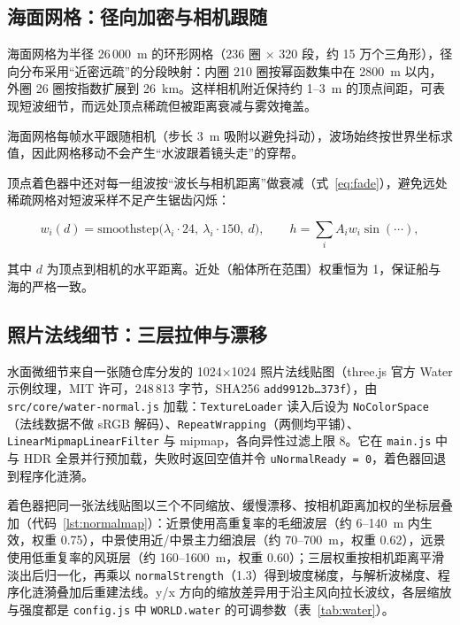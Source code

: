 \documentclass[UTF8, a4paper, 11pt]{ctexart}
\newcommand{\file}[1]{\texttt{#1}}
\begin{document}
\subsection{海面网格：径向加密与相机跟随}

海面网格为半径 26\,000~m 的环形网格（236 圈 $\times$ 320 段，约 15 万个三角形），径向分布采用“近密远疏”的分段映射：内圈 210 圈按幂函数集中在 2800~m 以内，外圈 26 圈按指数扩展到 26~km。这样相机附近保持约 1--3~m 的顶点间距，可表现短波细节，而远处顶点稀疏但被距离衰减与雾效掩盖。

海面网格每帧水平跟随相机（步长 3~m 吸附以避免抖动），波场始终按世界坐标求值，因此网格移动不会产生“水波跟着镜头走”的穿帮。

顶点着色器中还对每一组波按“波长与相机距离”做衰减（式~\ref{eq:fade}），避免远处稀疏网格对短波采样不足产生锯齿闪烁：

\begin{equation}
w_i(d)=\mathrm{smoothstep}\big(\lambda_i\!\cdot\!24,\ \lambda_i\!\cdot\!150,\ d\big),\qquad
h=\sum_i A_i w_i \sin(\cdots),
\label{eq:fade}
\end{equation}

其中 $d$ 为顶点到相机的水平距离。近处（船体所在范围）权重恒为 1，保证船与海的严格一致。

\subsection{照片法线细节：三层拉伸与漂移}

水面微细节来自一张随仓库分发的 1024$\times$1024 照片法线贴图（three.js 官方 Water 示例纹理，MIT 许可，248\,813 字节，SHA256 \texttt{add9912b\ldots 373f}），由 \file{src/core/water-normal.js} 加载：\texttt{TextureLoader} 读入后设为 \texttt{NoColorSpace}（法线数据不做 sRGB 解码）、\texttt{RepeatWrapping}（两侧均平铺）、\texttt{LinearMipmapLinearFilter} 与 mipmap，各向异性过滤上限 8。它在 \file{main.js} 中与 HDR 全景并行预加载，失败时返回空值并令 \texttt{uNormalReady = 0}，着色器回退到程序化涟漪。

着色器把同一张法线贴图以三个不同缩放、缓慢漂移、按相机距离加权的坐标层叠加（代码~\ref{lst:normalmap}）：近景使用高重复率的毛细波层（约 6--140~m 内生效，权重 0.75），中景使用近/中景主力细浪层（约 70--700~m，权重 0.62），远景使用低重复率的风斑层（约 160--1600~m，权重 0.60）；三层权重按相机距离平滑淡出后归一化，再乘以 \texttt{normalStrength}（1.3）得到坡度梯度，与解析波梯度、程序化涟漪叠加后重建法线。y/x 方向的缩放差异用于沿主风向拉长波纹，各层缩放与强度都是 \file{config.js} 中 \texttt{WORLD.water} 的可调参数（表~\ref{tab:water}）。
\end{document}
